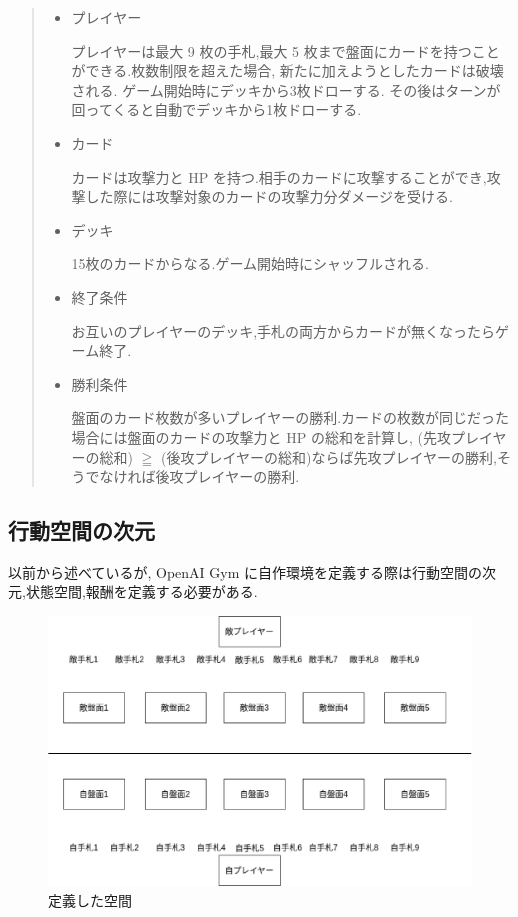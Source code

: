 \documentclass{jarticle}     %
\begin{document}
\begin{quote}
  \begin{itemize}
   \item プレイヤー
   \par
   プレイヤーは最大 9 枚の手札,最大 5 枚まで盤面にカードを持つことができる.枚数制限を超えた場合, 新たに加えようとしたカードは破壊される.
   ゲーム開始時にデッキから3枚ドローする.
   その後はターンが回ってくると自動でデッキから1枚ドローする.
   \item カード
   \par
   カードは攻撃力と HP を持つ.相手のカードに攻撃することができ,攻撃した際には攻撃対象のカードの攻撃力分ダメージを受ける.
   \item デッキ
   \par
   15枚のカードからなる.ゲーム開始時にシャッフルされる.
   \item 終了条件
   \par
   お互いのプレイヤーのデッキ,手札の両方からカードが無くなったらゲーム終了.
   \item 勝利条件
   \par
   盤面のカード枚数が多いプレイヤーの勝利.カードの枚数が同じだった場合には盤面のカードの攻撃力と HP の総和を計算し, (先攻プレイヤーの総和) $\geqq$ (後攻プレイヤーの総和)ならば先攻プレイヤーの勝利,そうでなければ後攻プレイヤーの勝利.
  \end{itemize}
 \end{quote}

\subsection{行動空間の次元}
以前から述べているが, OpenAI Gym に自作環境を定義する際は行動空間の次元,状態空間,報酬を定義する必要がある.

\begin{figure}[htbp]
  \centering
  \includegraphics[width=150mm]{assets/Field.eps}
  \caption{定義した空間}
  \label{fig:Field}
\end{figure}
\end{document}
